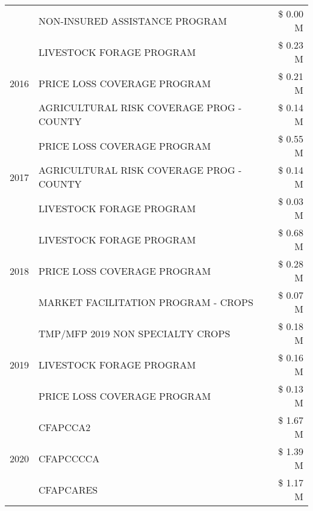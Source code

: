 \begin{tabular}{llr}
 & NON-INSURED ASSISTANCE PROGRAM & \$ 0.00 M \\
\cline{1-3}
\multirow[t]{3}{*}{2016} & LIVESTOCK FORAGE PROGRAM & \$ 0.23 M \\
 & PRICE LOSS COVERAGE PROGRAM & \$ 0.21 M \\
 & AGRICULTURAL RISK COVERAGE PROG - COUNTY & \$ 0.14 M \\
\cline{1-3}
\multirow[t]{3}{*}{2017} & PRICE LOSS COVERAGE PROGRAM & \$ 0.55 M \\
 & AGRICULTURAL RISK COVERAGE PROG - COUNTY & \$ 0.14 M \\
 & LIVESTOCK FORAGE PROGRAM & \$ 0.03 M \\
\cline{1-3}
\multirow[t]{3}{*}{2018} & LIVESTOCK FORAGE PROGRAM & \$ 0.68 M \\
 & PRICE LOSS COVERAGE PROGRAM & \$ 0.28 M \\
 & MARKET FACILITATION PROGRAM - CROPS & \$ 0.07 M \\
\cline{1-3}
\multirow[t]{3}{*}{2019} & TMP/MFP 2019 NON SPECIALTY CROPS & \$ 0.18 M \\
 & LIVESTOCK FORAGE PROGRAM & \$ 0.16 M \\
 & PRICE LOSS COVERAGE PROGRAM & \$ 0.13 M \\
\cline{1-3}
\multirow[t]{3}{*}{2020} & CFAPCCA2 & \$ 1.67 M \\
 & CFAPCCCCA & \$ 1.39 M \\
 & CFAPCARES & \$ 1.17 M \\
\cline{1-3}
\bottomrule
\end{tabular}
